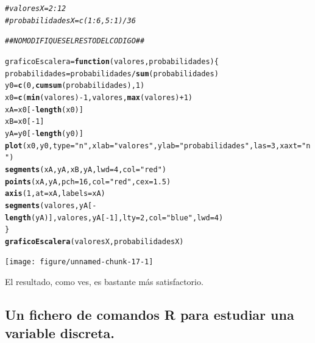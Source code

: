 \documentclass[10pt,a4paper]{article}\usepackage[]{graphicx}\usepackage[]{color}
\makeatletter
\newcommand{\hlnum}[1]{\textcolor[rgb]{0.686,0.059,0.569}{#1}}%
\newcommand{\hlstr}[1]{\textcolor[rgb]{0.192,0.494,0.8}{#1}}%
\newcommand{\hlcom}[1]{\textcolor[rgb]{0.678,0.584,0.686}{\textit{#1}}}%
\newcommand{\hlopt}[1]{\textcolor[rgb]{0,0,0}{#1}}%
\newcommand{\hlstd}[1]{\textcolor[rgb]{0.345,0.345,0.345}{#1}}%
\newcommand{\hlkwa}[1]{\textcolor[rgb]{0.161,0.373,0.58}{\textbf{#1}}}%
\newcommand{\hlkwb}[1]{\textcolor[rgb]{0.69,0.353,0.396}{#1}}%
\newcommand{\hlkwc}[1]{\textcolor[rgb]{0.333,0.667,0.333}{#1}}%
\newcommand{\hlkwd}[1]{\textcolor[rgb]{0.737,0.353,0.396}{\textbf{#1}}}%
\newenvironment{kframe}{%
 \def\at@end@of@kframe{}%
 \ifinner\ifhmode%
  \def\at@end@of@kframe{\end{minipage}}%
  \begin{minipage}{\columnwidth}%
 \fi\fi%
 \def\FrameCommand##1{\hskip\@totalleftmargin \hskip-\fboxsep
 \colorbox{shadecolor}{##1}\hskip-\fboxsep
     \hskip-\linewidth \hskip-\@totalleftmargin \hskip\columnwidth}%
 \MakeFramed {\advance\hsize-\width
   \@totalleftmargin\z@ \linewidth\hsize
   \@setminipage}}%
 {\par\unskip\endMakeFramed%
 \at@end@of@kframe}
\newenvironment{knitrout}{}{} %
\makeatother
\begin{document}
\begin{knitrout}
\color{fgcolor}\begin{kframe}
\begin{alltt}
\hlcom{# valoresX = 2:12}
\hlcom{# probabilidadesX = c(1:6,5:1) / 36}

\hlcom{##  NO MODIFIQUES EL RESTO DEL CODIGO ##}

\hlstd{graficoEscalera} \hlkwb{=} \hlkwa{function}\hlstd{(}\hlkwc{valores}\hlstd{,} \hlkwc{probabilidades} \hlstd{)\{}
  \hlstd{probabilidades} \hlkwb{=} \hlstd{probabilidades}\hlopt{/}\hlkwd{sum}\hlstd{(probabilidades)}
  \hlstd{y0} \hlkwb{=} \hlkwd{c}\hlstd{(}\hlnum{0}\hlstd{,}\hlkwd{cumsum}\hlstd{(probabilidades),} \hlnum{1}\hlstd{)}
  \hlstd{x0} \hlkwb{=} \hlkwd{c}\hlstd{(}\hlkwd{min}\hlstd{(valores)}\hlopt{-}\hlnum{1}\hlstd{,valores,} \hlkwd{max}\hlstd{(valores)}\hlopt{+}\hlnum{1}\hlstd{)}
  \hlstd{xA} \hlkwb{=} \hlstd{x0[}\hlopt{-}\hlkwd{length}\hlstd{(x0)]}
  \hlstd{xB} \hlkwb{=} \hlstd{x0[}\hlopt{-}\hlnum{1}\hlstd{]}
  \hlstd{yA} \hlkwb{=} \hlstd{y0[}\hlopt{-}\hlkwd{length}\hlstd{(y0)]}
  \hlkwd{plot}\hlstd{(x0, y0,} \hlkwc{type}\hlstd{=}\hlstr{"n"}\hlstd{,} \hlkwc{xlab}\hlstd{=}\hlstr{"valores"}\hlstd{,} \hlkwc{ylab}\hlstd{=}\hlstr{"probabilidades"}\hlstd{,} \hlkwc{las}\hlstd{=}\hlnum{3}\hlstd{,} \hlkwc{xaxt}\hlstd{=}\hlstr{"n"}\hlstd{)}
  \hlkwd{segments}\hlstd{(xA,yA,xB,yA,} \hlkwc{lwd}\hlstd{=}\hlnum{4}\hlstd{,} \hlkwc{col}\hlstd{=}\hlstr{"red"}\hlstd{)}
  \hlkwd{points}\hlstd{(xA, yA,} \hlkwc{pch}\hlstd{=}\hlnum{16}\hlstd{,} \hlkwc{col}\hlstd{=}\hlstr{"red"}\hlstd{,} \hlkwc{cex}\hlstd{=}\hlnum{1.5}\hlstd{)}
  \hlkwd{axis}\hlstd{(}\hlnum{1}\hlstd{,} \hlkwc{at}\hlstd{=xA,}   \hlkwc{labels}\hlstd{=xA)}
  \hlkwd{segments}\hlstd{(valores, yA[}\hlopt{-}\hlkwd{length}\hlstd{(yA)] , valores, yA[}\hlopt{-}\hlnum{1}\hlstd{],} \hlkwc{lty}\hlstd{=}\hlnum{2}\hlstd{,} \hlkwc{col}\hlstd{=}\hlstr{"blue"}\hlstd{,} \hlkwc{lwd}\hlstd{=}\hlnum{4}\hlstd{)}
\hlstd{\}}
\hlkwd{graficoEscalera}\hlstd{(valoresX, probabilidadesX)}
\end{alltt}
\end{kframe}
\texttt{[image: figure/unnamed-chunk-17-1]} 

\end{knitrout}
El resultado, como ves, es bastante más satisfactorio.

\subsection{Un fichero de comandos R para estudiar una variable discreta.}
\label{tut04:subsec:FicheroComandosRParaVaraiableDiscreta}
\end{document}
